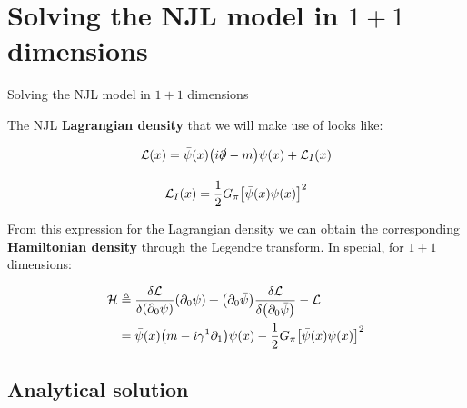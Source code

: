 \documentclass[9pt, handout, aspectratio=169]{beamer}	%
\begin{document}
\section{Solving the NJL model in $1+1$ dimensions}

\begin{frame}{Solving the NJL model in $1+1$ dimensions}

	The NJL \textbf{Lagrangian density} that we will make use of looks like:

	\begin{gather*}
		\mathcal{L}(x) =
	    \bar{\psi}(x) \qty(i\slashed{\partial}-m) \psi(x) + \mathcal{L}_{I}(x) \\[10pt]
		\mathcal{L}_{I}(x) =
	    \frac{1}{2} G_{\pi} \qty[\bar{\psi}(x)\psi(x)]^2
	\end{gather*}

	From this expression for the Lagrangian density we can obtain the corresponding \textbf{Hamiltonian density} through the Legendre transform. In special, for $1+1$ dimensions:

	\begin{align*}
	  \mathcal{H} &\defeq
	    \fdv{\mathcal{L}}{\qty(\partial_{0} \psi)} \qty(\partial_{0} \psi) +
	    \qty(\partial_{0} \bar{\psi})
	    \fdv{\mathcal{L}}{\qty(\partial_{0} \bar{\psi})} -
	    \mathcal{L} \\
	  &= \bar{\psi}(x)\qty(m - i\gamma^{1}\partial_{1})\psi(x) -
    	\frac{1}{2} G_{\pi} \qty[\bar{\psi}(x)\psi(x)]^{2}
	\end{align*}

\end{frame}


\subsection{Analytical solution}
\end{document}
